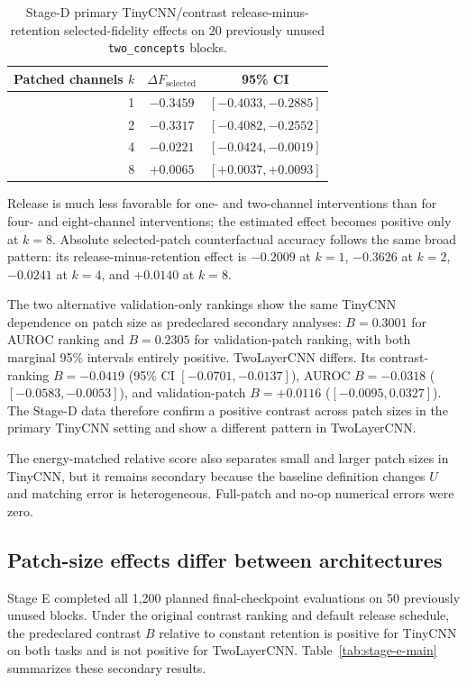 \documentclass[10pt]{article}
\begin{document}
\begin{table}[t]
\caption{Stage-D primary TinyCNN/contrast release-minus-retention selected-fidelity effects on 20 previously unused \texttt{two\_concepts} blocks.}
\label{tab:primary-curve}
\centering
\small
\begin{tabular}{rcc}
\toprule
Patched channels $k$ & $\Delta F_{\mathrm{selected}}$ & 95\% CI \\
\midrule
1 & $-0.3459$ & $[-0.4033,-0.2885]$ \\
2 & $-0.3317$ & $[-0.4082,-0.2552]$ \\
4 & $-0.0221$ & $[-0.0424,-0.0019]$ \\
8 & $+0.0065$ & $[+0.0037,+0.0093]$ \\
\bottomrule
\end{tabular}
\end{table}

Release is much less favorable for one- and two-channel interventions than for four- and eight-channel interventions; the estimated effect becomes positive only at $k=8$. Absolute selected-patch counterfactual accuracy follows the same broad pattern: its release-minus-retention effect is $-0.2009$ at $k=1$, $-0.3626$ at $k=2$, $-0.0241$ at $k=4$, and $+0.0140$ at $k=8$.

The two alternative validation-only rankings show the same TinyCNN dependence on patch size as predeclared secondary analyses: $B=0.3001$ for AUROC ranking and $B=0.2305$ for validation-patch ranking, with both marginal 95\% intervals entirely positive. TwoLayerCNN differs. Its contrast-ranking $B=-0.0419$ (95\% CI $[-0.0701,-0.0137]$), AUROC $B=-0.0318$ ($[-0.0583,-0.0053]$), and validation-patch $B=+0.0116$ ($[-0.0095,0.0327]$). The Stage-D data therefore confirm a positive contrast across patch sizes in the primary TinyCNN setting and show a different pattern in TwoLayerCNN.

The energy-matched relative score also separates small and larger patch sizes in TinyCNN, but it remains secondary because the baseline definition changes $U$ and matching error is heterogeneous. Full-patch and no-op numerical errors were zero.

\subsection{Patch-size effects differ between architectures}\label{sec:exhaustive}

Stage E completed all 1,200 planned final-checkpoint evaluations on 50 previously unused blocks. Under the original contrast ranking and default release schedule, the predeclared contrast $B$ relative to constant retention is positive for TinyCNN on both tasks and is not positive for TwoLayerCNN. Table~\ref{tab:stage-e-main} summarizes these secondary results.
\end{document}
